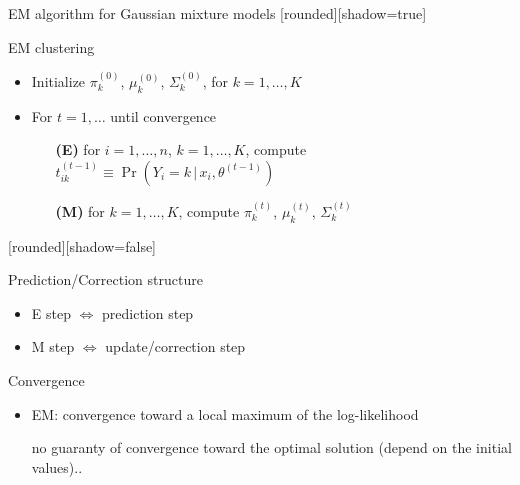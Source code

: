 \documentclass[compress, smaller, serif, 9pt]{beamer}
\newcommand{\structuretext}[1]{{\usebeamercolor[fg]{structure} #1}}
\newcommand{\doigtr}{\alert{\noindent \Pisymbol{pzd}{43}}}
\begin{document}
\begin{frame}{EM algorithm for Gaussian mixture models}
[rounded][shadow=true]

\begin{block}{EM clustering}
\begin{itemize}
\item Initialize $\pi_k^{(0)}$, $\mu_k^{(0)}$,  $\Sigma_k^{(0)}$, for $k=1,\ldots,K$
\item For $t=1,\ldots$ until convergence
\begin{itemize}
\item[\structuretext{\textbf{(E)}}] for $i=1,\ldots,n$, $k=1,\ldots,K$,
compute $t_{ik}^{(t-1)} \equiv \Pr{\left(Y_i=k\,|\, x_i,\theta^{(t-1)} \right) }$
\item[\structuretext{\textbf{(M)}}] for $k=1,\ldots,K$, compute $\pi_k^{(t)}$, $\mu_k^{(t)}$,  $\Sigma_k^{(t)}$
 \end{itemize}
  \end{itemize}
\end{block}

[rounded][shadow=false]

\begin{block}{Prediction/Correction structure}
 \begin{itemize}
 \item E step $\Leftrightarrow$ prediction step
 \item M step $\Leftrightarrow$ update/correction step
\end{itemize}
\end{block}


\begin{block}{Convergence}
 \begin{itemize}
 \item EM: convergence toward a local maximum of the log-likelihood
 \item[\doigtr] no guaranty of convergence toward the optimal solution (depend on the initial values).. 
\end{itemize}
\end{block}


\end{frame}
\end{document}
